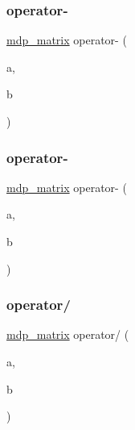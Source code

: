 \mbox{\label{classmdp__matrix_aa6a8885aa8604478e5e4481e1f10d700}} 
\subsubsection{\texorpdfstring{operator-\/}{operator-}\hspace{0.1cm}{\footnotesize\ttfamily [5/6]}}
{\footnotesize\ttfamily \hyperlink{classmdp__matrix}{mdp\+\_\+matrix} operator-\/ (\begin{DoxyParamCaption}\item[{const \hyperlink{classmdp__matrix}{mdp\+\_\+matrix} \&}]{a,  }\item[{\hyperlink{mdp__global__vars_8h_a69d96b74c791e0bbdb888b3913a69450}{mdp\+\_\+real}}]{b }\end{DoxyParamCaption})\hspace{0.3cm}{\ttfamily [friend]}}

\mbox{\label{classmdp__matrix_a0034bcdf68e3b07c30b406e046401937}} 
\subsubsection{\texorpdfstring{operator-\/}{operator-}\hspace{0.1cm}{\footnotesize\ttfamily [6/6]}}
{\footnotesize\ttfamily \hyperlink{classmdp__matrix}{mdp\+\_\+matrix} operator-\/ (\begin{DoxyParamCaption}\item[{\hyperlink{mdp__global__vars_8h_a69d96b74c791e0bbdb888b3913a69450}{mdp\+\_\+real}}]{a,  }\item[{const \hyperlink{classmdp__matrix}{mdp\+\_\+matrix} \&}]{b }\end{DoxyParamCaption})\hspace{0.3cm}{\ttfamily [friend]}}

\mbox{\label{classmdp__matrix_a9966401a50b7969c45d1fc3e3290f404}} 
\subsubsection{\texorpdfstring{operator/}{operator/}\hspace{0.1cm}{\footnotesize\ttfamily [1/5]}}
{\footnotesize\ttfamily \hyperlink{classmdp__matrix}{mdp\+\_\+matrix} operator/ (\begin{DoxyParamCaption}\item[{const \hyperlink{classmdp__matrix}{mdp\+\_\+matrix} \&}]{a,  }\item[{const \hyperlink{classmdp__matrix}{mdp\+\_\+matrix} \&}]{b }\end{DoxyParamCaption})\hspace{0.3cm}{\ttfamily [friend]}}

